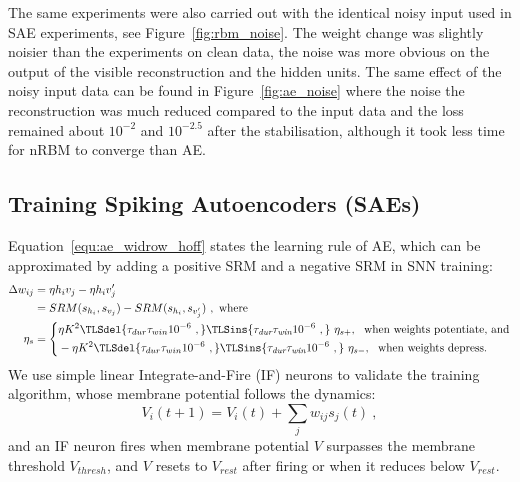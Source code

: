 The same experiments were also carried out with the identical noisy input used in \protect{} SAE experiments, see Figure~\ref{fig:rbm_noise}.
The weight change was slightly noisier than the experiments on clean data, \protect{} \protect{} the noise was more obvious on the output of the visible reconstruction and the hidden units.
The same effect of the noisy input data can be found in Figure~\ref{fig:ae_noise} where the noise \protect{} \protect{} the reconstruction was much reduced compared to the input data and the loss remained about $10^{-2}$ and $10^{-2.5}$ after the stabilisation, although it took less time for \protect{} nRBM to converge than AE.


\subsection{Training Spiking Autoencoders (SAEs)}
\label{subsec:SAE}
Equation~\ref{equ:ae_widrow_hoff} states the learning rule of AE, which can be approximated by adding a positive SRM and a negative SRM in SNN training:
\begin{equation}
\label{equ:sae}
\begin{aligned}
\Delta w_{ij} &= \eta h_i v_j - \eta h_i v'_j \\
&= SRM(s_{h_i}, s_{v_j}) - SRM(s_{h_i}, s_{v'_j})~, \textrm{~where}\\
\eta_{s}&=\left \{
\begin{aligned}
 &\eta K^2 \protect\TLSdel{\tau_{dur} \tau_{win}10^{-6}~,} \protect\TLSins{\tau_{\textit{\textrm{dur}}} \tau_{\textit{\textrm{win}}}10^{-6}~,} ~\eta_{s+},~\textrm{~when weights potentiate,~and}\\
 & -\eta K^2 \protect\TLSdel{\tau_{dur} \tau_{win}10^{-6}~,} \protect\TLSins{\tau_{\textit{\textrm{dur}}} \tau_{\textit{\textrm{win}}}10^{-6}~,} ~\eta_{s-},~\textrm{~when weights depress.}
 \end{aligned} 
 \right.
\end{aligned} 
\end{equation}
We use simple linear Integrate-and-Fire (IF) neurons to validate the training algorithm, whose membrane potential follows the dynamics:
\begin{equation}
V_i(t+1)=V_i(t) + \sum_j w_{ij} s_j(t)~,
\end{equation}
and an IF neuron fires when \protect{} membrane potential $V$ surpasses the membrane threshold $V_{thresh}$, and $V$ resets to $V_{rest}$ after firing or when it reduces below \protect{} $V_{rest}$.
